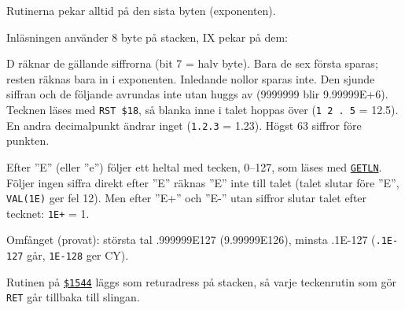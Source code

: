 \begin{Listing}
\begin{Note}
\begin{Verb}
\end{Verb}
\par\noindent Rutinerna pekar alltid på den sista byten (exponenten).\par
\par\noindent Inläsningen använder 8 byte på stacken, IX pekar på dem:\par
\begin{Verb}
\end{Verb}
\par\noindent D räknar de gällande siffrorna (bit 7 = halv byte). Bara de sex första sparas; resten räknas bara in i exponenten. Inledande nollor sparas inte. Den sjunde siffran och de följande avrundas inte utan huggs av (9999999 blir 9.99999E+6). Tecknen läses med \texttt{RST \$18}, så blanka inne i talet hoppas över (\texttt{1 2 . 5} = 12.5). En andra decimalpunkt ändrar inget (\texttt{1.2.3} = 1.23). Högst 63 siffror före punkten.\par
\par\noindent Efter ”E” (eller ”e”) följer ett heltal med tecken, 0–127, som läses med \hyperlink{l:GETLN}{\texttt{GETLN}}. Följer ingen siffra direkt efter ”E” räknas ”E” inte till talet (talet slutar före ”E”, \texttt{VAL({}1E{})} ger fel 12). Men efter ”E+” och ”E-” utan siffror slutar talet efter tecknet: \texttt{1E+} = 1.\par
\par\noindent Omfånget (provat): största tal .999999E127 (9.99999E126), minsta .1E\mbox{-}127 (\texttt{.1E-127} går, \texttt{1E-128} ger CY).\par
\par\noindent Rutinen på \hyperlink{a:1544}{\texttt{\$1544}} läggs som returadress på stacken, så varje teckenrutin som gör \texttt{RET} går tillbaka till slingan.\par\end{Note}

\end{Listing}
